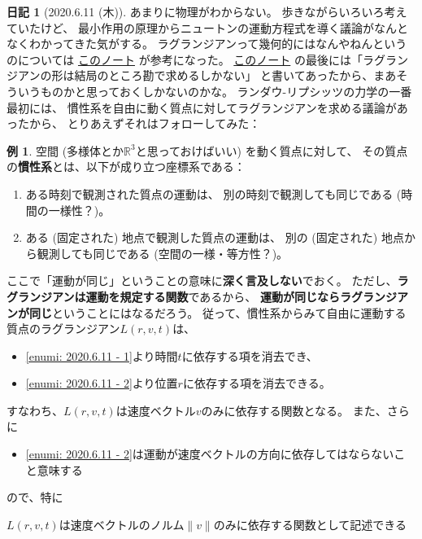 \documentclass[uplatex]{jsarticle}
\theoremstyle{definition}
\newtheorem*{exam*}{例}
\newtheorem*{nikki*}{日記}
\def\R{\mathbb{R}}
\begin{document}
\begin{nikki*}[2020.6.11 (木)]
  あまりに物理がわからない。
  歩きながらいろいろ考えていたけど、
  最小作用の原理からニュートンの運動方程式を導く議論がなんとなくわかってきた気がする。
  ラグランジアンって幾何的にはなんやねんというのについては
  \href{http://www.asahi-net.or.jp/~fu5k-mths/pdf/geo_lag.pdf}{このノート}
  が参考になった。
  \href{http://www.asahi-net.or.jp/~fu5k-mths/pdf/geo_lag.pdf}{このノート}
  の最後には「ラグランジアンの形は結局のところ勘で求めるしかない」
  と書いてあったから、まあそういうものかと思っておくしかないのかな。
  ランダウ-リプシッツの力学の一番最初には、
  慣性系を自由に動く質点に対してラグランジアンを求める議論があったから、
  とりあえずそれはフォローしてみた：
  \begin{exam*}
    空間 (多様体とか\(\R^3\)と思っておけばいい) を動く質点に対して、
    その質点の\textbf{慣性系}とは、以下が成り立つ座標系である：
    \begin{enumerate}
      \item \label{enumi: 2020.6.11 - 1}
      ある時刻で観測された質点の運動は、
      別の時刻で観測しても同じである
      (時間の一様性？)。
      \item \label{enumi: 2020.6.11 - 2}
      ある (固定された) 地点で観測した質点の運動は、
      別の (固定された) 地点から観測しても同じである
      (空間の一様・等方性？)。
    \end{enumerate}
    ここで「運動が同じ」ということの意味に\textbf{深く言及しない}でおく。
    ただし、\textbf{ラグランジアンは運動を規定する関数}であるから、
    \textbf{運動が同じならラグランジアンが同じ}ということにはなるだろう。
    従って、慣性系からみて自由に運動する質点のラグランジアン\(L(r,v,t)\)は、
    \begin{itemize}
      \item \ref{enumi: 2020.6.11 - 1}より時間\(t\)に依存する項を消去でき、
      \item \ref{enumi: 2020.6.11 - 2}より位置\(r\)に依存する項を消去できる。
    \end{itemize}
    すなわち、\(L(r,v,t)\)は速度ベクトル\(v\)のみに依存する関数となる。
    また、さらに
    \begin{itemize}
      \item
      \ref{enumi: 2020.6.11 - 2}は運動が速度ベクトルの方向に依存してはならないこと意味する
    \end{itemize}
    ので、特に
    \begin{center}
      \(L(r,v,t)\)は速度ベクトルのノルム\(\|v\|\)のみに依存する関数として記述できる

\end{center}
\end{exam*}
\end{nikki*}
\end{document}
